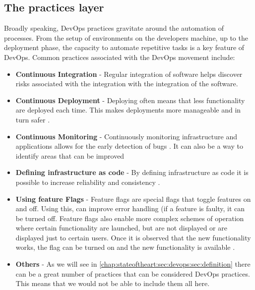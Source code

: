       \subsection{The practices layer} \label{chap:stateoftheart:sec:devops:sec:practices}
      Broadly speaking, DevOps practices gravitate around the automation of processes. From the setup of environments on the developers machine, up to the deployment phase, the capacity to automate repetitive tasks is a key feature of DevOps.
      Common practices associated with the DevOps movement include:
      \begin{itemize}
        \item \textbf{Continuous Integration} - Regular integration of software helps discover risks associated with the integration with the integration of the software. \cite{And2015}
        \item \textbf{Continuous Deployment} - Deploying often means that less functionality are deployed each time. This makes deployments more manageable and in turn safer \cite{Allspaw}.
        \item \textbf{Continuous Monitoring} - Continuously monitoring infrastructure and applications allows for the early detection of bugs \cite{Cukier2013}. It can also be a way to identify areas that can be improved \cite{Willis2010}
        \item \textbf{Defining infrastructure as code} - By defining infrastructure as code it is possible to increase reliability and consistency \cite{Loukides2012}.
        \item \textbf{Using feature Flags} - Feature flags are special flags that toggle features on and off. Using this, can improve error handling (if a feature is faulty, it can be turned off. Feature flags also enable more complex schemes of operation where certain functionality are launched, but are not displayed or are displayed just to certain users. Once it is observed that the new functionality works, the flag can be turned on and the new functionality is available \cite{Bass}.
        \item \textbf{Others} - As we will see in \ref{chap:stateoftheart:sec:devops:sec:definition} there can be a great number of practices that can be considered DevOps practices. This means that we would not be able to include them all here.
      \end{itemize}

